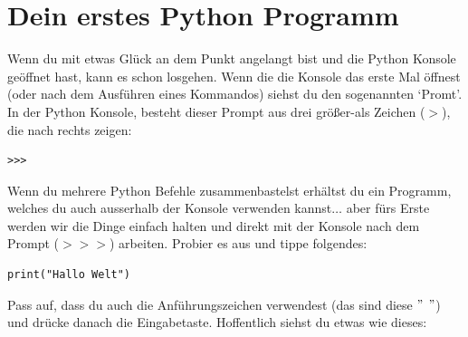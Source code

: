 \section{Dein erstes Python Programm}

Wenn du mit etwas Glück an dem Punkt angelangt bist und die Python Konsole geöffnet hast, kann es schon losgehen. Wenn die die Konsole das erste Mal öffnest (oder nach dem Ausführen eines Kommandos) siehst du den sogenannten `Promt'. In der Python Konsole, besteht dieser Prompt aus drei größer-als Zeichen ($>$), die nach rechts zeigen:

\begin{Verbatim}[frame=single]
>>>
\end{Verbatim}

Wenn du mehrere Python Befehle zusammenbastelst erhältst du ein Programm, welches du auch ausserhalb der Konsole verwenden kannst$\ldots$ aber fürs Erste werden wir die Dinge einfach halten und direkt mit der Konsole nach dem Prompt ($>>>$) arbeiten. Probier es aus und tippe folgendes:

\begin{Verbatim}[frame=single]
print("Hallo Welt")
\end{Verbatim}

Pass auf, dass du auch die Anführungszeichen verwendest (das sind diese $"$ $"$) und drücke danach die Eingabetaste. Hoffentlich siehst du etwas wie dieses:

